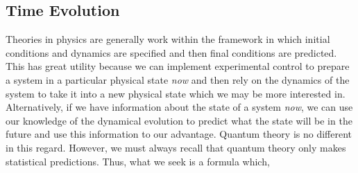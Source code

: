 \documentclass[12pt]{article}
\begin{document}
\subsection{Time Evolution}

Theories in physics are generally work within the framework in which initial conditions and dynamics are specified and then final conditions are predicted. This has great utility because we can implement experimental control to prepare a system in a particular physical state \textit{now} and then rely on the dynamics of the system to take it into a new physical state which we may be more interested in. Alternatively, if we have information about the state of a system \textit{now}, we can use our knowledge of the dynamical evolution to predict what the state will be in the future and use this information to our advantage. Quantum theory is no different in this regard. However, we must always recall that quantum theory only makes statistical predictions. Thus, what we seek is a formula which, 
\end{document}
